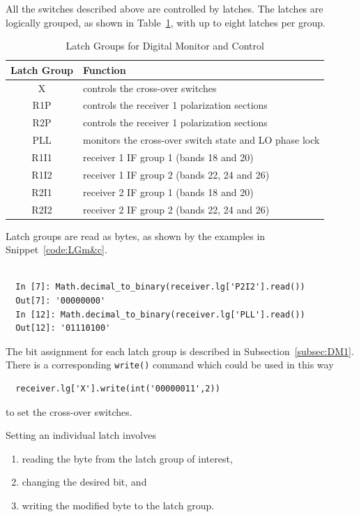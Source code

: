 \documentclass[letterpaper,11pt]{book}
\begin{document}
All the switches described above are controlled by latches.  The latches are
logically grouped, as shown in Table~\ref{tab:latches}, with up to eight
latches per group.
\begin{table}[h!tb]
  \begin{center}
    \caption{\label{tab:latches}Latch Groups for Digital Monitor and Control}
    \begin{tabular}{|c|l|}
      \hline
      {\bf Latch Group} & {\bf Function} \\
      \hline
      X & controls the cross-over switches \\
      R1P & controls the receiver 1 polarization sections \\
      R2P & controls the receiver 1 polarization sections \\
      PLL & monitors the cross-over switch state and LO phase lock \\
      R1I1 & receiver 1 IF group 1 (bands 18 and 20) \\
      R1I2 & receiver 1 IF group 2 (bands 22, 24 and 26) \\
      R2I1 & receiver 2 IF group 1 (bands 18 and 20) \\
      R2I2 & receiver 2 IF group 2 (bands 22, 24 and 26) \\
      \hline
    \end{tabular}
  \end{center}
\end{table}
Latch groups are read as bytes, as shown by the examples in 
Snippet~\ref{code:LGm&c}.
\begin{code}[h!tb]
\begin{center}
\begin{verbatim}

  In [7]: Math.decimal_to_binary(receiver.lg['P2I2'].read())
  Out[7]: '00000000'
  In [12]: Math.decimal_to_binary(receiver.lg['PLL'].read())
  Out[12]: '01110100'
\end{verbatim}
\caption{\label{code:LGm&c}Setting a latch group.}
\end{center}
\end{code}
The bit assignment for each latch group is described in
Subsection~\ref{subsec:DM1}.  There is a
corresponding {\tt write()} command which could be used in this way
\begin{verbatim}
  receiver.lg['X'].write(int('00000011',2))
\end{verbatim}
to set the cross-over switches.

Setting an individual latch involves
\begin{enumerate}\itemsep0pt \parskip0pt 
  \item reading the byte from the latch group of interest,
  \item changing the desired bit, and
  \item writing the modified byte to the latch group.
\end{enumerate}
\end{document}
